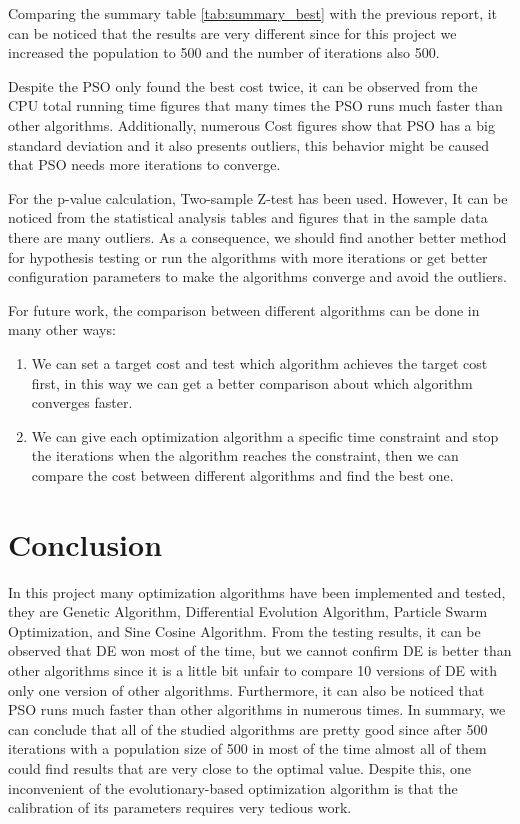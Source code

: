 \documentclass[12pt]{article}
\begin{document}
Comparing the summary table \ref{tab:summary_best}  with the previous report, it can be noticed that the results are very different since for this project we increased the population to 500 and the number of iterations also 500. 

Despite the PSO only found the best cost twice, it can be observed from the CPU total running time figures that many times the PSO runs much faster than other algorithms. 
Additionally, numerous Cost figures show that PSO has a big standard deviation and it also presents outliers, this behavior might be caused that PSO needs more iterations to converge.

For the p-value calculation, Two-sample Z-test has been used. However, It can be noticed from the statistical analysis tables and figures that in the sample data there are many outliers. As a consequence, we should find another better method for hypothesis testing or run the algorithms with more iterations or get better configuration parameters to make the algorithms converge and avoid the outliers.


For future work, the comparison between different algorithms can be done in many other ways: 

   \begin{enumerate}[label=\arabic*)]
\item We can set a target cost and test which algorithm achieves the target cost first, in this way we can get a better comparison about which algorithm converges faster.
  
\item We can give each optimization algorithm a specific time constraint and stop the iterations when the algorithm reaches the constraint, then we can compare the cost between different algorithms and find the best one.
\end{enumerate}


    \section{Conclusion}



    In this project many optimization algorithms have been implemented and tested, they are Genetic Algorithm, Differential Evolution Algorithm, Particle Swarm Optimization, and Sine Cosine Algorithm. From the testing results, it can be observed that DE won most of the time, but we cannot confirm DE is better than other algorithms since it is a little bit unfair to compare 10 versions of DE with only one version of other algorithms.  Furthermore, it can also be noticed that PSO runs much faster than other algorithms in numerous times. In summary, we can conclude that all of the studied algorithms are pretty good since after 500 iterations with a population size of 500 in most of the time almost all of them could find results that are very close to the optimal value. Despite this, one inconvenient of the evolutionary-based optimization algorithm is that the calibration of its parameters requires very tedious work.



\end{document}
